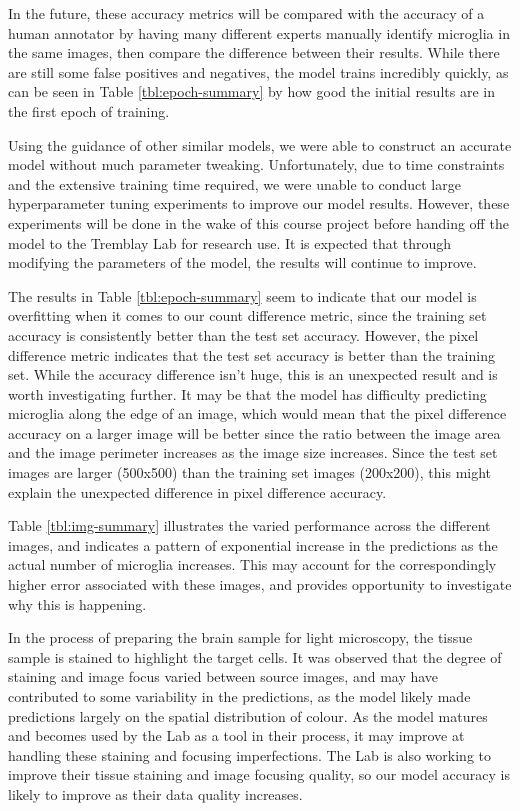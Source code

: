 \documentclass{article}
\begin{document}
In the future, these accuracy metrics will be compared with the accuracy of a 
human annotator by having many different experts manually identify microglia 
in the same images, then compare the difference between their results. While 
there are still some false positives and negatives, the model trains 
incredibly quickly, as can be seen in Table \ref{tbl:epoch-summary} by how 
good the initial results are in the first epoch of training. 

Using the guidance of other similar models, we were able to construct an 
accurate model without much parameter tweaking. Unfortunately, due to time 
constraints and the extensive training time required, we were unable to 
conduct large hyperparameter tuning experiments to improve our model results. 
However, these experiments will be done in the wake of this course project 
before handing off the model to the Tremblay Lab for research use. It is 
expected that through modifying the parameters of the model, the results will 
continue to improve.

The results in Table \ref{tbl:epoch-summary} seem to indicate that our model 
is overfitting when it comes to our count difference metric, since the 
training set accuracy is consistently better than the test set accuracy. 
However, the pixel difference metric indicates that the test set accuracy is 
better than the training set. While the accuracy difference isn't huge, this 
is an unexpected result and is worth investigating further. It may be that 
the model has difficulty predicting microglia along the edge of an image, 
which would mean that the pixel difference accuracy on a larger image will be 
better since the ratio between the image area and the image perimeter 
increases as the image size increases. Since the test set images are larger 
(500x500) than the training set images (200x200), this might explain the 
unexpected difference in pixel difference accuracy.

Table \ref{tbl:img-summary} illustrates the varied performance across the 
different images, and indicates a pattern of exponential increase in the 
predictions as the actual number of microglia increases. This may account for 
the correspondingly higher error associated with these images, and provides 
opportunity to investigate why this is happening.

In the process of preparing the brain sample for light microscopy, the tissue 
sample is stained to highlight the target cells. It was observed that the 
degree of staining and image focus varied between source images, and may have 
contributed to some variability in the predictions, as the model likely made 
predictions largely on the spatial distribution of colour. As the model 
matures and becomes used by the Lab as a tool in their process, it may 
improve at handling these staining and focusing imperfections. The Lab is 
also working to improve their tissue staining and image focusing quality, so 
our model accuracy is likely to improve as their data quality increases.
\end{document}
